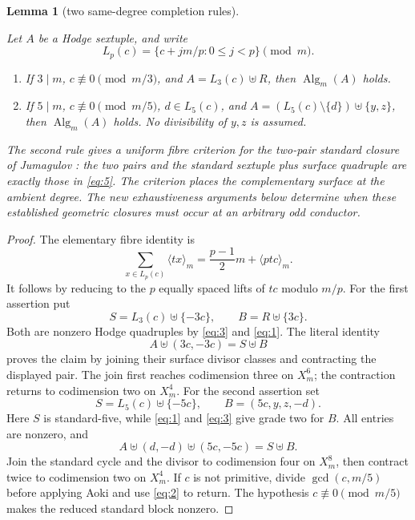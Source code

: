 \documentclass[11pt]{amsart}
\numberwithin{theorem}{section}
\newtheorem{lemma}[theorem]{Lemma}
\theoremstyle{remark}
\numberwithin{equation}{section}
\providecommand{\tightlist}{\setlength{\itemsep}{0pt}\setlength{\parskip}{0pt}}
\begin{document}
\begin{lemma}[two same-degree completion rules]\label{lemma:3.3}

Let \(A\) be a Hodge sextuple, and write
\[
L_p(c)=\{c+jm/p:0\le j<p\}\pmod m.
\]

\begin{enumerate}[label=\arabic*.,leftmargin=*]\tightlist
\item If \(3\mid m\), \(c\not\equiv0\pmod{m/3}\), and
\(A=L_3(c)\uplus R\), then \(\operatorname{Alg}_m(A)\) holds.
\item If \(5\mid m\), \(c\not\equiv0\pmod{m/5}\), \(d\in L_5(c)\), and
\(A=(L_5(c)\setminus\{d\})\uplus\{y,z\}\), then
\(\operatorname{Alg}_m(A)\) holds. No divisibility of \(y,z\) is assumed.
\end{enumerate}

The second rule gives a uniform fibre criterion for the two-pair standard
closure of Jumagulov \cite[Theorem 1.3, p.~4]{jumagulov2026}: the two pairs and the
standard sextuple plus surface quadruple are exactly those in \eqref{eq:5}.
The criterion places the complementary surface at the ambient degree.
The new exhaustiveness arguments below determine when these established
geometric closures must occur at an arbitrary odd conductor.

\end{lemma}
\begin{proof}

The elementary fibre identity is
\[
\sum_{x\in L_p(c)}\langle tx\rangle_m
=\frac{p-1}{2}m+\langle ptc\rangle_m.
\tag{3}\label{eq:3}
\]
It follows by reducing to the \(p\) equally spaced lifts of \(tc\) modulo
\(m/p\). For the first assertion put
\[
S=L_3(c)\uplus\{-3c\},\qquad B=R\uplus\{3c\}.
\]
Both are nonzero Hodge quadruples by \eqref{eq:3} and \eqref{eq:1}. The literal identity
\[
A\uplus(3c,-3c)=S\uplus B
\tag{4}\label{eq:4}
\]
proves the claim by joining their surface divisor classes and contracting
the displayed pair. The join first reaches codimension three on \(X_m^6\);
the contraction returns to codimension two on \(X_m^4\). For the second
assertion set
\[
S=L_5(c)\uplus\{-5c\},\qquad B=(5c,y,z,-d).
\]
Here \(S\) is standard-five, while \eqref{eq:1} and \eqref{eq:3} give grade two for \(B\).
All entries are nonzero, and
\[
A\uplus(d,-d)\uplus(5c,-5c)=S\uplus B.
\tag{5}\label{eq:5}
\]
Join the standard cycle and the divisor to codimension four on \(X_m^8\),
then contract twice to codimension two on \(X_m^4\). If \(c\) is not
primitive, divide \(\gcd(c,m/5)\) before applying Aoki and use \eqref{eq:2} to
return. The hypothesis \(c\not\equiv0\pmod{m/5}\) makes the reduced
standard block nonzero.
\end{proof}
\end{document}
